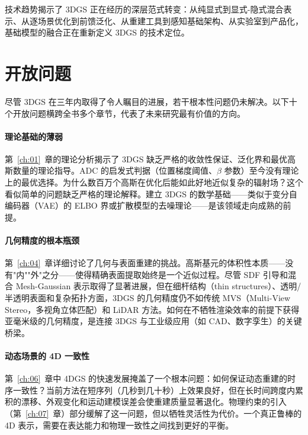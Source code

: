 \begin{takeaway}
技术趋势揭示了 3DGS 正在经历的深层范式转变：从纯显式到显式-隐式混合表示、从逐场景优化到前馈泛化、从重建工具到感知基础架构、从实验室到产品化，基础模型的融合正在重新定义 3DGS 的技术定位。
\end{takeaway}

\section{开放问题}
\label{sec:22_3}

尽管 3DGS 在三年内取得了令人瞩目的进展，若干根本性问题仍未解决。以下十个开放问题横跨全书多个章节，代表了未来研究最有价值的方向。

\paragraph{理论基础的薄弱}
第~\ref{ch:01}~章的理论分析揭示了 3DGS 缺乏严格的收敛性保证、泛化界和最优高斯数量的理论指导。ADC 的启发式判据（位置梯度阈值、$\beta$ 参数）至今没有理论上的最优选择。为什么数百万个高斯在优化后能如此好地近似复杂的辐射场？这个看似简单的问题缺乏严格的理论解释。建立 3DGS 的数学基础——类似于变分自编码器（VAE）的 ELBO 界或扩散模型的去噪理论——是该领域走向成熟的前提。

\paragraph{几何精度的根本瓶颈}
第~\ref{ch:04}~章详细讨论了几何与表面重建的挑战。高斯基元的体积性本质——没有"内""外"之分——使得精确表面提取始终是一个近似过程。尽管 SDF 引导和混合 Mesh-Gaussian 表示取得了显著进展，但在细杆结构（thin structures）、透明/半透明表面和复杂拓扑方面，3DGS 的几何精度仍不如传统 MVS（Multi-View Stereo，多视角立体匹配）和 LiDAR 方法。如何在不牺牲渲染效率的前提下获得亚毫米级的几何精度，是连接 3DGS 与工业级应用（如 CAD、数字孪生）的关键桥梁。

\paragraph{动态场景的 4D 一致性}
第~\ref{ch:06}~章中 4DGS 的快速发展掩盖了一个根本问题：如何保证动态重建的时序一致性？当前方法在短序列（几秒到几十秒）上效果良好，但在长时间跨度内累积的漂移、外观变化和运动建模误差会使重建质量显著退化。物理约束的引入（第~\ref{ch:07}~章）部分缓解了这一问题，但以牺牲灵活性为代价。一个真正鲁棒的 4D 表示，需要在表达能力和物理一致性之间找到更好的平衡。


